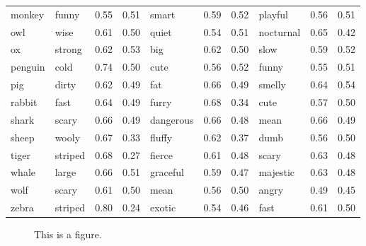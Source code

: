 \documentclass[10pt,letterpaper]{article}
\begin{document}
\begin{table}[t]
\begin{tabular}{l lllllllll}
monkey & funny & 0.55 & 0.51 & smart & 0.59 & 0.52 & playful & 0.56 & 0.51 \\
owl & wise & 0.61 & 0.50 & quiet & 0.54 & 0.51 & nocturnal & 0.65 & 0.42 \\
ox & strong & 0.62 & 0.53 & big & 0.62 & 0.50 & slow & 0.59 & 0.52 \\
penguin & cold & 0.74 & 0.50 & cute & 0.56 & 0.52 & funny & 0.55 & 0.51 \\
pig & dirty & 0.62 & 0.49 & fat & 0.66 & 0.49 & smelly & 0.64 & 0.54 \\
rabbit & fast & 0.64 & 0.49 & furry & 0.68 & 0.34 & cute & 0.57 & 0.50 \\
shark & scary & 0.66 & 0.49 & dangerous & 0.66 & 0.48 & mean & 0.66 & 0.49 \\
sheep & wooly & 0.67 & 0.33 & fluffy & 0.62 & 0.37 & dumb & 0.56 & 0.50 \\
tiger & striped & 0.68 & 0.27 & fierce & 0.61 & 0.48 & scary & 0.63 & 0.48 \\
whale & large & 0.66 & 0.51 & graceful & 0.59 & 0.47 & majestic & 0.63 & 0.48 \\
wolf & scary & 0.61 & 0.50 & mean & 0.56 & 0.50 & angry & 0.49 & 0.45 \\
zebra & striped & 0.80 & 0.24 & exotic & 0.54 & 0.46 & fast & 0.61 & 0.50 \\

\bottomrule
\end{tabular}
\end{table}


\begin{figure}[h]
\begin{center}
\end{center}
\caption{This is a figure.} 
\label{prior}
\end{figure}
\end{document}
